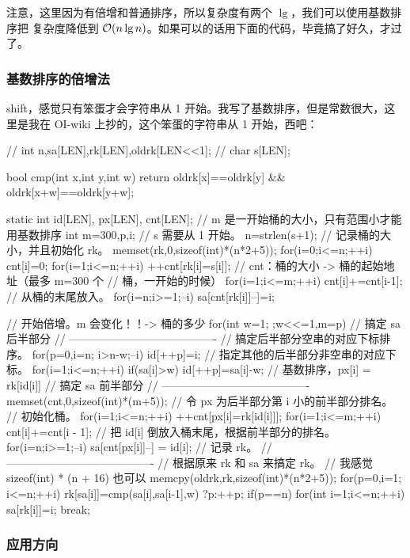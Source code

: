 注意，这里因为有倍增和普通排序，所以复杂度有两个 $\lg$，我们可以使用基数排序把
复杂度降低到 $\mathcal{O}(n \lg n)$。如果可以的话用下面的代码，毕竟搞了好久，才过了。

\subsubsection{基数排序的倍增法}
shift，感觉只有笨蛋才会字符串从 1 开始。我写了基数排序，但是常数很大，这里是我在
OI-wiki 上抄的，这个笨蛋的字符串从 1 开始，西吧：
\begin{Cpp}
// int n,sa[LEN],rk[LEN],oldrk[LEN<<1];
// char s[LEN];

bool cmp(int x,int y,int w) {
  return oldrk[x]==oldrk[y]
      && oldrk[x+w]==oldrk[y+w];
}

{
  static int id[LEN], px[LEN], cnt[LEN];
  // m 是一开始桶的大小，只有范围小才能用基数排序
  int m=300,p,i;
  // s 需要从 1 开始。
  n=strlen(s+1);
  // 记录桶的大小，并且初始化 rk。
  memset(rk,0,sizeof(int)*(n*2+5));
  for(i=0;i<=n;++i) cnt[i]=0;
  for(i=1;i<=n;++i) ++cnt[rk[i]=s[i]];
  // cnt：桶的大小 -> 桶的起始地址（最多 m=300 个
  // 桶，一开始的时候）
  for(i=1;i<=m;++i) cnt[i]+=cnt[i-1];
  // 从桶的末尾放入。
  for(i=n;i>=1;--i) sa[cnt[rk[i]]--]=i;

  // 开始倍增。m 会变化！！-> 桶的多少
  for(int w=1;  ;w<<=1,m=p){
    // 搞定 sa 后半部分
    // ----------------------------------------
    // 搞定后半部分空串的对应下标排序。
    for(p=0,i=n;  i>n-w;--i) id[++p]=i;
    // 指定其他的后半部分非空串的对应下标。
    for(i=1;i<=n;++i)
      if(sa[i]>w) id[++p]=sa[i]-w;
    // 基数排序，px[i] = rk[id[i]]
    // 搞定 sa 前半部分
    // ----------------------------------------
    memset(cnt,0,sizeof(int)*(m+5));
    // 令 px 为后半部分第 i 小的前半部分排名。
    // 初始化桶。
    for(i=1;i<=n;++i) ++cnt[px[i]=rk[id[i]]];
    for(i=1;i<=m;++i) cnt[i]+=cnt[i - 1];
    // 把 id[i] 倒放入桶末尾，根据前半部分的排名。
    for(i=n;i>=1;--i) sa[cnt[px[i]]--] = id[i];
    // 记录 rk。
    // ----------------------------------------
    // 根据原来 rk 和 sa 来搞定 rk。
    // 我感觉 sizeof(int) * (n + 16) 也可以
    memcpy(oldrk,rk,sizeof(int)*(n*2+5));
    for(p=0,i=1; i<=n;++i)
      rk[sa[i]]=cmp(sa[i],sa[i-1],w) ?p:++p;
    if(p==n){
      for(int i=1;i<=n;++i) sa[rk[i]]=i;
      break;
    }
  }
}
\end{Cpp}

\subsubsection{应用方向}

